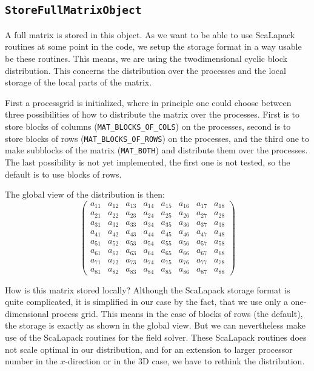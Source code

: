 \subsection{\texttt{StoreFullMatrixObject}}
A full matrix is stored in this object. As we want to be able to use
ScaLapack routines at some point in the code, we setup the storage
format in a way usable be these routines. This means, we are using the
twodimensional cyclic block distribution. This concerns the
distribution over the processes and the local storage of the local
parts of the matrix. 

First a processgrid is initialized, where in principle one could choose between three
possibilities of how to distribute the matrix over the processes. First
is to store blocks of columns (\texttt{MAT\_BLOCKS\_OF\_COLS}) on the processes, second is to store
blocks of rows (\texttt{MAT\_BLOCKS\_OF\_ROWS}) on the processes, and the third one to make subblocks
of the matrix (\texttt{MAT\_BOTH}) and distribute them over the processes. The last
possibility is not yet implemented, the first one is not tested, so
the default is to use blocks of rows.

The global view of the distribution is then:
\begin{equation}
  \label{eq:matrix}
  \left(\begin{array}{cccccccc}
    a_{11} &a_{12} &a_{13}& a_{14} & a_{15} & a_{16} & a_{17} & a_{18}\\
    a_{21} &a_{22} &a_{23}& a_{24} & a_{25} & a_{26} & a_{27} & a_{28}\\
    a_{31} &a_{32} &a_{33}& a_{34} & a_{35} & a_{36} & a_{37} & a_{38}\\
    a_{41} &a_{42} &a_{43}&a_{44}& a_{45} & a_{46} & a_{47} & a_{48}\\\hline
    a_{51} &a_{52} &a_{53}&a_{54} &a_{55}& a_{56} & a_{57} & a_{58}\\
    a_{61} &a_{62} &a_{63}&a_{64} &a_{65} &a_{66}& a_{67} & a_{68}\\
    a_{71} &a_{72} &a_{73}&a_{74} &a_{75} &a_{76} &a_{77}& a_{78}\\
    a_{81} &a_{82} &a_{83}&a_{84} &a_{85} &a_{86}  &a_{87} &a_{88}
  \end{array}\right)
\end{equation}

How is this matrix stored locally?
Although the ScaLapack storage format is quite complicated, it is
simplified in our case by the fact, that we use only a one-dimensional
process grid. This means in the case of blocks of rows (the default),
the storage is exactly as shown in the global view. But we can
nevertheless make use of the ScaLapack routines for the field
solver. These ScaLapack routines does not scale optimal in our
distribution, and for an extension to larger processor number in the
$x$-direction or in the 3D case, we have to rethink the distribution.

